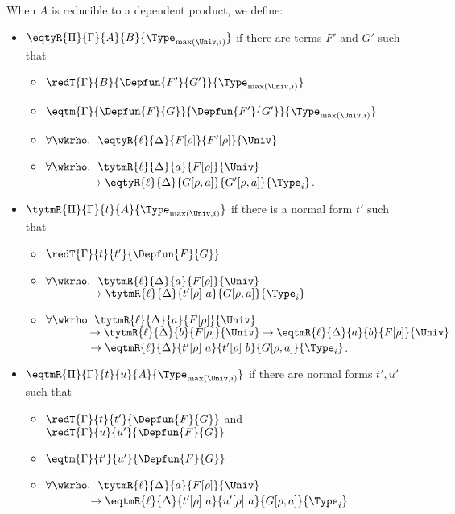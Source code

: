 When $A$ is reducible to a dependent product, we define:
\begin{itemize}
  \item \( \eqtyR{\Pi}{\Gamma}{A}{B}{\Type_{\mathrm{max}(\Univ, i)}} \) if there are terms \( F' \) and \( G' \) such that
    \begin{itemize}
      \item \( \redT{\Gamma}{B}{\Depfun{F'}{G'}}{\Type_{\mathrm{max}(\Univ, i)}} \) 
      \item \( \eqtm{\Gamma}{\Depfun{F}{G}}{\Depfun{F'}{G'}}{\Type_{\mathrm{max}(\Univ, i)}} \)
      \item \( \forall \wkrho.\ \ \eqtyR{\ell}{\Delta}{F[\rho]}{F'[\rho]}{\Univ} \)
      \item \( \forall \wkrho.\ \ {\tytmR{\ell}{\Delta}{a}{F[\rho]}{\Univ}} \) 
            \\ \( \phantom{\forall \wkrho} \to {\eqtyR{\ell}{\Delta}{G[\rho, a]}{G'[\rho, a]}{\Type_i}} \).
      \end{itemize}
    \item \( \tytmR{\Pi}{\Gamma}{t}{A}{{\Type_{\mathrm{max}(\Univ, i)}}} \) if there is a normal form \( t' \) such that
    \begin{itemize}
      \item \( \redT{\Gamma}{t}{t'}{\Depfun{F}{G}} \)
      \item \( \forall \wkrho.\ \ {\tytmR{\ell}{\Delta}{a}{F[\rho]}{\Univ}} \) 
            \\ \( \phantom{\forall \wkrho} \to {\tytmR{\ell}{\Delta}{t'[\rho]\ a}{G[\rho, a]}{\Type_i}} \)
      \item \( \forall \wkrho.\ {\tytmR{\ell}{\Delta}{a}{F[\rho]}{\Univ}} \)
            \\ \( \phantom{\forall \wkrho} \to {\tytmR{\ell}{\Delta}{b}{F[\rho]}{\Univ}} \to {\eqtmR{\ell}{\Delta}{a}{b}{F[\rho]}{\Univ}} \)
            \\ \( \phantom{\forall \wkrho} \to {\eqtmR{\ell}{\Delta}{t'[\rho]\ a}{t'[\rho]\ b}{G[\rho,a]}{\Type_i}} \).
    \end{itemize}
  \item \( \eqtmR{\Pi}{\Gamma}{t}{u}{A}{\Type_{\mathrm{max}(\Univ, i)}} \) if there are normal forms \( t', u' \) such that
    \begin{itemize}
      \item \( \redT{\Gamma}{t}{t'}{\Depfun{F}{G}} \)
      and \( \redT{\Gamma}{u}{u'}{\Depfun{F}{G}} \)
      \item \( \eqtm{\Gamma}{t'}{u'}{\Depfun{F}{G}} \)
      \item \( \forall \wkrho.\ \ {\tytmR{\ell}{\Delta}{a}{F[\rho]}{\Univ}} \)
            \\ \( \phantom{\forall \wkrho} \to {\eqtmR{\ell}{\Delta}{t'[\rho]\ a}{u'[\rho]\ a}{G[\rho, a]}{\Type_i}} \).
    \end{itemize}
  \end{itemize}

